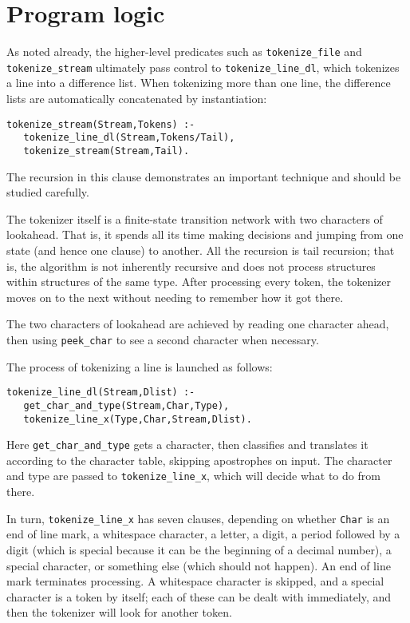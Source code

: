 \documentclass[12pt]{article}
\begin{document}
\section{Program logic}

As noted already, the higher-level predicates such as \verb"tokenize_file"
and \verb"tokenize_stream" ultimately pass control to \verb"tokenize_line_dl",
which tokenizes a line into a difference list.
When tokenizing more than one line, the difference lists are automatically
concatenated by instantiation:
\begin{verbatim}
tokenize_stream(Stream,Tokens) :-
   tokenize_line_dl(Stream,Tokens/Tail),
   tokenize_stream(Stream,Tail).
\end{verbatim}
The recursion in this clause demonstrates an important technique and should be
studied carefully.

The tokenizer itself is a finite-state transition network with two characters of
lookahead.
That is, it spends all its time making decisions and jumping from one state
(and hence one clause) to another.
All the recursion is tail recursion; that is, the algorithm is not inherently
recursive and does not process structures within structures of the same type.
After processing every token, the tokenizer moves on to the next without needing
to remember how it got there.

The two characters of lookahead are achieved by reading one character ahead,
then using \verb"peek_char" to see a second character when necessary.

The process of tokenizing a line is launched as follows:
\begin{verbatim}
tokenize_line_dl(Stream,Dlist) :-
   get_char_and_type(Stream,Char,Type),
   tokenize_line_x(Type,Char,Stream,Dlist).
\end{verbatim}
Here \verb"get_char_and_type" gets a character, then classifies and translates it
according to the character table, skipping apostrophes on input.
The character and type are passed to
\verb"tokenize_line_x", which will decide what to do from there.

In turn, \verb"tokenize_line_x" has seven clauses, depending on
whether \verb"Char" is an end of line mark, a whitespace character,
a letter, a digit, a period followed by a digit (which is special because
it can be the beginning of a decimal number), a special character,
or something else (which should not happen).
An end of line mark terminates processing.
A whitespace character is skipped, and a
special character is a token by itself;
each of these can be dealt with immediately, and then the tokenizer will
look for another token.
\end{document}
